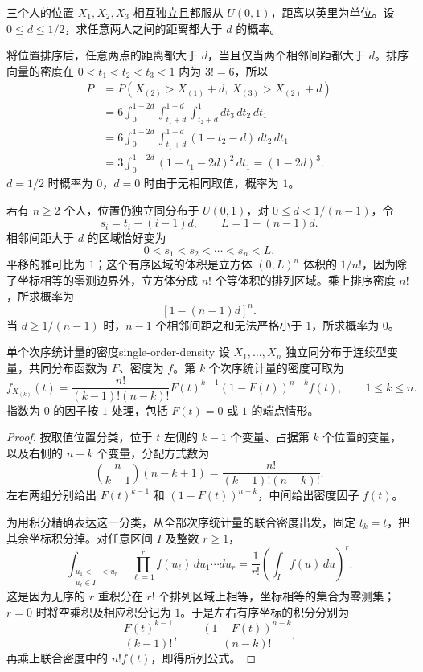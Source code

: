 \begin{example}[路上随机位置的最小间距]
三个人的位置 $X_1,X_2,X_3$ 相互独立且都服从 $U(0,1)$，距离以英里为单位。设 $0\leq d\leq1/2$，求任意两人之间的距离都大于 $d$ 的概率。

将位置排序后，任意两点的距离都大于 $d$，当且仅当两个相邻间距都大于 $d$。排序向量的密度在 $0<t_1<t_2<t_3<1$ 内为 $3!=6$，所以
\begin{align*}
P&=P(X_{(2)}>X_{(1)}+d,\ X_{(3)}>X_{(2)}+d)\\
&=6\int_0^{1-2d}\int_{t_1+d}^{1-d}\int_{t_2+d}^1
 dt_3\,dt_2\,dt_1\\
&=6\int_0^{1-2d}\int_{t_1+d}^{1-d}(1-t_2-d)\,dt_2\,dt_1\\
&=3\int_0^{1-2d}(1-t_1-2d)^2\,dt_1
=(1-2d)^3.
\end{align*}
$d=1/2$ 时概率为 $0$，$d=0$ 时由于无相同取值，概率为 $1$。

若有 $n\geq2$ 个人，位置仍独立同分布于 $U(0,1)$，对 $0\leq d<1/(n-1)$，令
\[
s_i=t_i-(i-1)d,\qquad L=1-(n-1)d.
\]
相邻间距大于 $d$ 的区域恰好变为
\[
0<s_1<s_2<\cdots<s_n<L.
\]
平移的雅可比为 $1$；这个有序区域的体积是立方体 $(0,L)^n$ 体积的 $1/n!$，因为除了坐标相等的零测边界外，立方体分成 $n!$ 个等体积的排列区域。乘上排序密度 $n!$，所求概率为
\[
[1-(n-1)d]^n.
\]
当 $d\geq1/(n-1)$ 时，$n-1$ 个相邻间距之和无法严格小于 $1$，所求概率为 $0$。
\end{example}

\begin{mytheorem}{单个次序统计量的密度}{single-order-density}
设 $X_1,\ldots,X_n$ 独立同分布于连续型变量，共同分布函数为 $F$、密度为 $f$。第 $k$ 个次序统计量的密度可取为
\[
f_{X_{(k)}}(t)=
\frac{n!}{(k-1)!(n-k)!}
F(t)^{k-1}(1-F(t))^{n-k}f(t),
\qquad 1\leq k\leq n.
\]
指数为 $0$ 的因子按 $1$ 处理，包括 $F(t)=0$ 或 $1$ 的端点情形。
\end{mytheorem}
\begin{proof}
按取值位置分类，位于 $t$ 左侧的 $k-1$ 个变量、占据第 $k$ 个位置的变量，以及右侧的 $n-k$ 个变量，分配方式数为
\[
\binom n{k-1}(n-k+1)=\frac{n!}{(k-1)!(n-k)!}.
\]
左右两组分别给出 $F(t)^{k-1}$ 和 $(1-F(t))^{n-k}$，中间给出密度因子 $f(t)$。

为用积分精确表达这一分类，从全部次序统计量的联合密度出发，固定 $t_k=t$，把其余坐标积分掉。对任意区间 $I$ 及整数 $r\geq1$，
\[
\int_{\substack{u_1<\cdots<u_r\\u_\ell\in I}}
\prod_{\ell=1}^rf(u_\ell)\,du_1\cdots du_r
=\frac1{r!}\left(\int_I f(u)\,du\right)^r.
\]
这是因为无序的 $r$ 重积分在 $r!$ 个排列区域上相等，坐标相等的集合为零测集；$r=0$ 时将空乘积及相应积分记为 $1$。于是左右有序坐标的积分分别为
\[
\frac{F(t)^{k-1}}{(k-1)!},
\qquad
\frac{(1-F(t))^{n-k}}{(n-k)!}.
\]
再乘上联合密度中的 $n!f(t)$，即得所列公式。
\end{proof}

